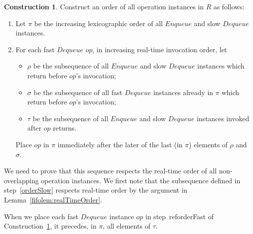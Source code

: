 \documentclass[a4paper,anonymous,USenglish]{lipics-v2021}
\theoremstyle{definition}
\newtheorem{construction}{Construction}
\begin{document}
\begin{construction}\label{constr:relaxed}
  Construct an order of all operation instances in $R$ as follows:
  \begin{enumerate}
  \item Let $\pi$ be the increasing lexicographic order of all $Enqueue$ and slow $Dequeue$ instances. \label{orderSlow}
  \item For each fast $Dequeue$ $op$, in increasing real-time invocation order, let
    \begin{itemize}
    \item $\rho$ be the subsequence of all $Enqueue$ and slow $Dequeue$ instances which return before $op$'s invocation;
    \item $\sigma$ be the subsequence of all fast $Dequeue$ instances already in $\pi$ which return before $op$'s invocation;
    \item $\tau$ be the subsequence of all $Enqueue$ and slow $Dequeue$ instances invoked after $op$ returns.
    \end{itemize}
    Place $op$ in $\pi$ immediately after the later of the last (in $\pi$) elements of $\rho$ and $\sigma$.\label{orderFast}
  \end{enumerate}
\end{construction}


We need to prove that this sequence respects the real-time order of all non-overlapping operation instances.  We first note that the subsequence defined in step~\ref{orderSlow} respects real-time order by the argument in Lemma~\ref{fifolem:realTimeOrder}.

\begin{lemma}\label{ooolem:fastDeqOrdering}
  When we place each fast $Dequeue$ instance $op$ in step~ref{orderFast} of Construction~\ref{constr:relaxed}, it precedes, in $\pi$, all elements of $\tau$.
\end{lemma}
\end{document}
